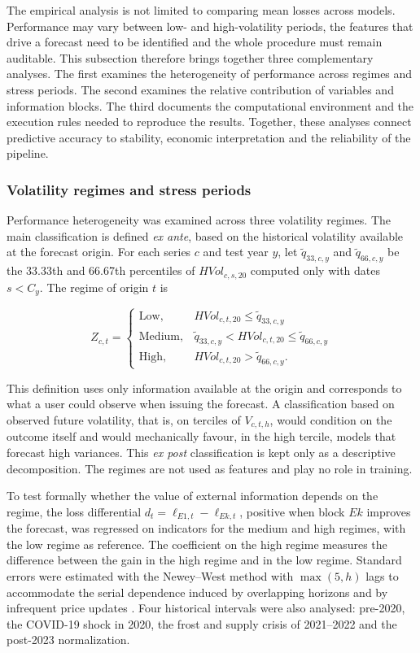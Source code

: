 \documentclass[a4paper,fleqn]{cas-sc}
\begin{document}
The empirical analysis is not limited to comparing mean losses across models. Performance may vary between low- and high-volatility periods, the features that drive a forecast need to be identified and the whole procedure must remain auditable. This subsection therefore brings together three complementary analyses. The first examines the heterogeneity of performance across regimes and stress periods. The second examines the relative contribution of variables and information blocks. The third documents the computational environment and the execution rules needed to reproduce the results. Together, these analyses connect predictive accuracy to stability, economic interpretation and the reliability of the pipeline.

\subsubsection{Volatility regimes and stress periods}
\label{subsec:regimes}

Performance heterogeneity was examined across three volatility regimes. The main classification is defined \textit{ex ante}, based on the historical volatility available at the forecast origin. For each series \(c\) and test year \(y\), let \(\tilde q_{33,c,y}\) and \(\tilde q_{66,c,y}\) be the 33.33th and 66.67th percentiles of \(HVol_{c,s,20}\) computed only with dates \(s<C_y\). The regime of origin \(t\) is

\begin{equation}
Z_{c,t}
=
\begin{cases}
\mathrm{Low}, & HVol_{c,t,20}\leq \tilde q_{33,c,y} \\
\mathrm{Medium}, & \tilde q_{33,c,y}<HVol_{c,t,20}\leq \tilde q_{66,c,y} \\
\mathrm{High}, & HVol_{c,t,20}>\tilde q_{66,c,y}.
\end{cases}
\label{eq:regimes}
\end{equation}

This definition uses only information available at the origin and corresponds to what a user could observe when issuing the forecast. A classification based on observed future volatility, that is, on terciles of \(V_{c,t,h}\), would condition on the outcome itself and would mechanically favour, in the high tercile, models that forecast high variances. This \textit{ex post} classification is kept only as a descriptive decomposition. The regimes are not used as features and play no role in training.

To test formally whether the value of external information depends on the regime, the loss differential \(d_t=\ell_{E1,t}-\ell_{Ek,t}\), positive when block \(Ek\) improves the forecast, was regressed on indicators for the medium and high regimes, with the low regime as reference. The coefficient on the high regime measures the difference between the gain in the high regime and in the low regime. Standard errors were estimated with the Newey--West method with \(\max(5,h)\) lags to accommodate the serial dependence induced by overlapping horizons and by infrequent price updates \citep{NeweyWest1987}. Four historical intervals were also analysed: pre-2020, the COVID-19 shock in 2020, the frost and supply crisis of 2021--2022 and the post-2023 normalization.
\end{document}
